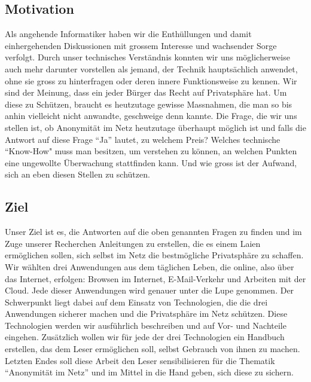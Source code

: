 \subsection{Motivation}
Als angehende Informatiker haben wir die Enthüllungen und damit einhergehenden Diskussionen mit grossem Interesse und wachsender Sorge verfolgt. Durch unser technisches Verständnis konnten wir uns möglicherweise auch mehr darunter vorstellen als jemand, der Technik hauptsächlich anwendet, ohne sie gross zu hinterfragen oder deren innere Funktionsweise zu kennen. Wir sind der Meinung, dass ein jeder Bürger das Recht auf Privatsphäre hat. Um diese zu Schützen, braucht es heutzutage gewisse Massnahmen, die man so bis anhin vielleicht nicht anwandte, geschweige denn kannte. Die Frage, die wir uns stellen ist, ob Anonymität im Netz heutzutage überhaupt möglich ist und falls die Antwort auf diese Frage ``Ja'' lautet, zu welchem Preis? Welches technische ``Know-How" muss man besitzen, um verstehen zu können, an welchen Punkten eine ungewollte Überwachung stattfinden kann. Und wie gross ist der Aufwand, sich an eben diesen Stellen zu schützen. 


\subsection{Ziel}
Unser Ziel ist es, die Antworten auf die oben genannten Fragen zu finden und im Zuge unserer Recherchen Anleitungen zu erstellen, die es einem Laien ermöglichen sollen, sich selbst im Netz die bestmögliche Privatsphäre zu schaffen. Wir wählten drei Anwendungen aus dem täglichen Leben, die online, also über das Internet, erfolgen: Browsen im Internet, E-Mail-Verkehr und Arbeiten mit der Cloud. Jede dieser Anwendungen wird genauer unter die Lupe genommen. Der Schwerpunkt liegt dabei auf dem Einsatz von Technologien, die die drei Anwendungen sicherer machen und die Privatsphäre im Netz schützen. Diese Technologien werden wir ausführlich beschreiben und auf Vor- und Nachteile eingehen. Zusätzlich wollen wir für jede der drei Technologien ein Handbuch erstellen, das dem Leser ermöglichen soll, selbst Gebrauch von ihnen zu machen. Letzten Endes soll diese Arbeit den Leser sensibilisieren für die Thematik ``Anonymität im Netz'' und im Mittel in die Hand geben, sich diese zu sichern.
